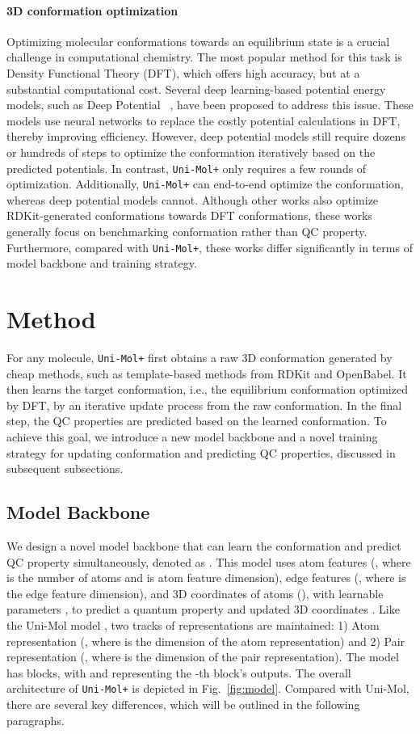\documentclass{article}
\newcommand{\name}{\texttt{Uni-Mol+}\xspace}
\begin{document}
\paragraph{3D conformation optimization}
Optimizing molecular conformations towards an equilibrium state is a crucial challenge in computational chemistry. The most popular method for this task is Density Functional Theory (DFT), which offers high accuracy, but at a substantial computational cost. Several deep learning-based potential energy models, such as Deep Potential ~\cite{zhang2018deep}, have been proposed to address this issue. These models use neural networks to replace the costly potential calculations in DFT, thereby improving efficiency. However, deep potential models still require dozens or hundreds of steps to optimize the conformation iteratively based on the predicted potentials. In contrast, \name only requires a few rounds of optimization. Additionally, \name can end-to-end optimize the conformation, whereas deep potential models cannot.
Although other works \cite{guan2022energyinspired, zhou2022uni} also optimize RDKit-generated conformations towards DFT conformations, these works generally focus on benchmarking conformation rather than QC property. Furthermore, compared with \name, these works differ significantly in terms of model backbone and training strategy. 


\section{Method}
For any molecule, \name first obtains a raw 3D conformation generated by cheap methods, such as template-based methods from RDKit and OpenBabel. It then learns the target conformation, i.e., the equilibrium conformation optimized by DFT, by an iterative update process from the raw conformation. In the final step, the QC properties are predicted based on the learned conformation. To achieve this goal, we introduce a new model backbone and a novel training strategy for updating conformation and predicting QC properties, discussed in subsequent subsections.


\subsection{Model Backbone}

We design a novel model backbone that can learn the conformation and predict QC property simultaneously, denoted as .
This model uses atom features (, where  is the number of atoms and  is atom feature dimension), edge features (, where  is the edge feature  dimension), and 3D coordinates of atoms (), with learnable parameters , to predict a quantum property  and updated 3D coordinates .
Like the Uni-Mol model \cite{zhou2022uni}, two tracks of representations are maintained: 1) Atom representation (, where  is the dimension of the atom representation) and 2) Pair representation (, where  is the dimension of the pair representation). The model has  blocks, with  and  representing the -th block's outputs.
The overall architecture of \name is depicted in Fig.~\ref{fig:model}. Compared with Uni-Mol, there are several key differences, which will be outlined in the following paragraphs.
\end{document}
